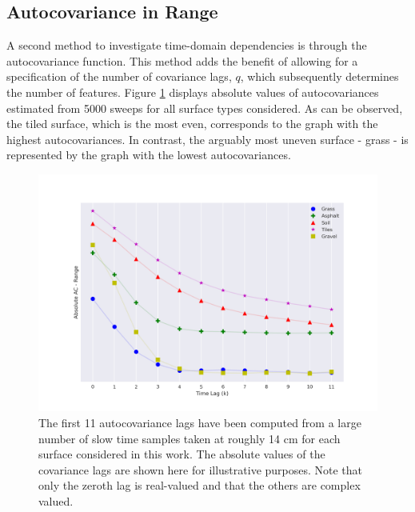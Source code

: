 \subsection{Autocovariance in Range}
\label{ACr}


A second method to investigate time-domain dependencies is through the autocovariance function. This method adds the benefit of allowing for a specification of the number of covariance lags, $q$, which subsequently determines the number of features. Figure \ref{fig:autocorr_range} displays absolute values of autocovariances estimated from 5000 sweeps for all surface types considered. As can be observed, the tiled surface, which is the most even, corresponds to the graph with the highest autocovariances. In contrast, the arguably most uneven surface - grass - is represented by the graph with the lowest autocovariances.

\begin{figure}[h]
	\centering
	\includegraphics[scale=0.45]{figs_temp/features/autocorr_range.png}
	\caption{The first 11 autocovariance lags have been computed from a large number of slow time samples taken at roughly 14 cm for each surface considered in this work. The absolute values of the covariance lags are shown here for illustrative purposes. Note that only the zeroth lag is real-valued and that the others are complex valued.}
	\label{fig:autocorr_range}
\end{figure}

